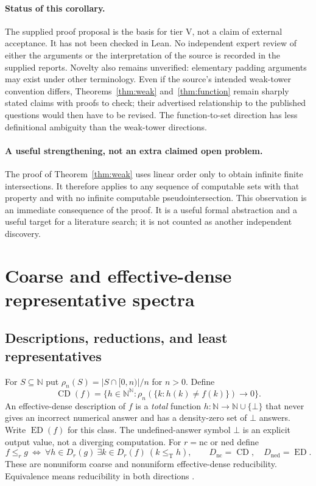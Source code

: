 \documentclass[11pt,a4paper]{article}
\newcommand{\N}{\mathbb N}
\newcommand{\Baire}{\N^{\N}}
\newcommand{\leT}{\leq_{\mathrm T}}
\newcommand{\EDesc}{\operatorname{ED}}\newcommand{\CDesc}{\operatorname{CD}}
\theoremstyle{definition}\newtheorem{definition}[theorem]{Definition}
\theoremstyle{remark}\newtheorem{remark}[theorem]{Remark}
\begin{document}
\paragraph{Status of this corollary.}
The supplied proof proposal is the basis for tier V, not a claim of external
acceptance. It has not been checked in Lean. No independent expert review of either the arguments or the interpretation of the source is recorded in the supplied reports.
Novelty also remains unverified: elementary padding arguments may exist under
other terminology. Even if the source's intended weak-tower convention
differs, Theorems~\ref{thm:weak} and~\ref{thm:function} remain sharply stated
claims with proofs to check; their advertised relationship to the published
questions would then have to be revised. The function-to-set direction has
less definitional ambiguity than the weak-tower directions.

\paragraph{A useful strengthening, not an extra claimed open problem.}
The proof of Theorem~\ref{thm:weak} uses linear order only to obtain infinite
finite intersections. It therefore applies to any sequence of computable sets
with that property and with no infinite computable pseudointersection.
This observation is an immediate consequence of the proof. It is a useful
formal abstraction and a useful target for a literature search; it is not
counted as another independent discovery.



\section{Coarse and effective-dense representative spectra}
\label{sec:coarse}
\subsection{Descriptions, reductions, and least representatives}
For $S\subseteq\N$ put $\rho_n(S)=|S\cap[0,n)|/n$ for $n>0$. Define
\[
 \CDesc(f)=\{h\in\Baire:\rho_n(\{k:h(k)\ne f(k)\})\longrightarrow0\}.
\]
An effective-dense description of $f$ is a \emph{total} function $h:\N\to\N\cup\{\bot\}$ that never gives an incorrect numerical answer and has a density-zero set of $\bot$ answers. Write $\EDesc(f)$ for this class. The undefined-answer symbol $\bot$ is an explicit output value, not a diverging computation. For $r=\mathrm{nc}$ or $\mathrm{ned}$ define
\[
 f\leq_r g\ \Longleftrightarrow\
 \forall h\in D_r(g)\ \exists k\in D_r(f)\ (k\leT h),
 \qquad D_{\mathrm{nc}}=\CDesc,\quad D_{\mathrm{ned}}=\EDesc.
\]
These are nonuniform coarse and nonuniform effective-dense reducibility. Equivalence means reducibility in both directions \cite{Gerdes}.
\end{document}
